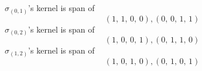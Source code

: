 \documentclass[8pt]{article}\usepackage{amsmath}
\begin{document}
\( \sigma_{(0, 1)}\)'s kernel is span of   
\[ \left(1,\,1,\,0,\,0\right) , \left(0,\,0,\,1,\,1\right) \]\( \sigma_{(0, 2)}\)'s kernel is span of   
\[ \left(1,\,0,\,0,\,1\right) , \left(0,\,1,\,1,\,0\right) \]\( \sigma_{(1, 2)}\)'s kernel is span of   
\[ \left(1,\,0,\,1,\,0\right) , \left(0,\,1,\,0,\,1\right) \]
\end{document}
